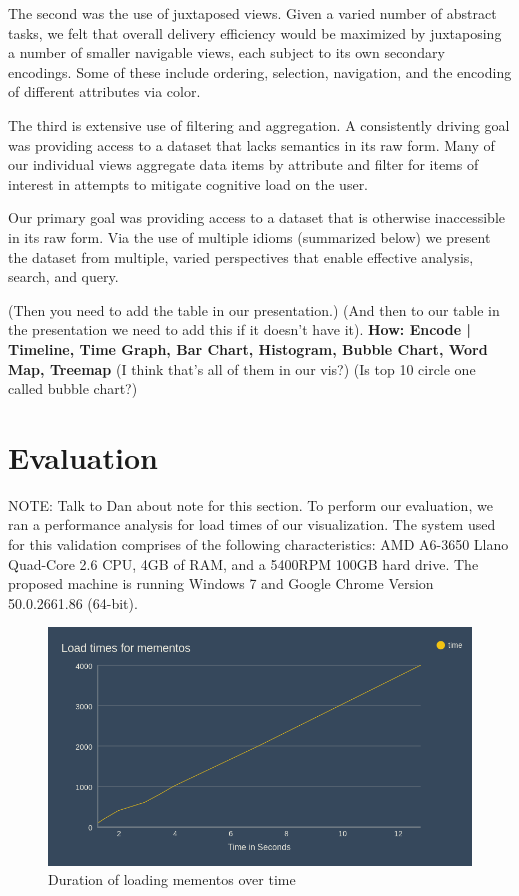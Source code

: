 \documentclass[10pt,journal,compsoc]{IEEEtran}
\begin{document}
The second was the use of juxtaposed views.
Given a varied number of abstract tasks, we felt that overall delivery efficiency would
be maximized by juxtaposing a number of smaller navigable views, each subject to its
own secondary encodings. Some of these include ordering, selection, navigation, and
the encoding of different attributes via color.

The third is extensive use of filtering and aggregation. A consistently driving goal 
was providing access to a dataset that lacks semantics in its raw form. Many of our
individual views aggregate data items by attribute and filter for items of interest 
in attempts to mitigate cognitive load on the user. 

Our primary goal was providing access to a dataset that is otherwise inaccessible in
its raw form. Via the use of multiple idioms (summarized below) we present the dataset
from multiple, varied perspectives that enable effective analysis, search, and query.

(Then you need to add the table in our presentation.) (And then to our table in the presentation we need to add this if it doesn't have it).
\textbf{How: Encode | Timeline, Time Graph, Bar Chart, Histogram, Bubble Chart, Word Map, Treemap}
(I think that's all of them in our vis?) (Is top 10 circle one called bubble chart?)

\section{Evaluation}

NOTE: Talk to Dan about note for this section.
To perform our evaluation, we ran a performance analysis for load times of our visualization. The system used for this validation comprises of the following characteristics: AMD A6-3650 Llano Quad-Core 2.6 CPU, 4GB of RAM, and a 5400RPM 100GB hard drive. The proposed machine is running Windows 7 and Google Chrome Version 50.0.2661.86 (64-bit). \par



\begin{figure}[b]
\centering
\includegraphics[scale=0.2]{Figure5}
\caption{Duration of loading mementos over time}
\label{fig:mesh4}
\end{figure}
\end{document}
